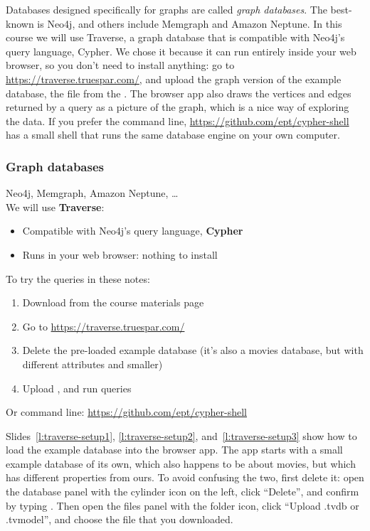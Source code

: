 Databases designed specifically for graphs are called \emph{graph databases}.
The best-known is Neo4j, and others include Memgraph and Amazon Neptune.
In this course we will use Traverse, a graph database that is compatible with Neo4j's query language, Cypher.
We chose it because it can run entirely inside your web browser, so you don't need to install anything: go to \url{https://traverse.truespar.com/}, and upload the graph version of the example database, the file  from the \materialspage{}.
The browser app also draws the vertices and edges returned by a query as a picture of the graph, which is a nice way of exploring the data.
If you prefer the command line, \url{https://github.com/ept/cypher-shell} has a small shell that runs the same database engine on your own computer.

\begin{frame}
    \label{s:traverse}
    \frametitle{Graph databases}
    Neo4j, Memgraph, Amazon Neptune, \dots\\[1em]
    We will use \textbf{Traverse}:
    \begin{itemize}
        \item Compatible with Neo4j's query language, \textbf{Cypher}
        \item Runs in your web browser: nothing to install\\[1em]\pause
    \end{itemize}
    To try the queries in these notes:
    \begin{enumerate}
        \item Download  from the course materials page
        \item Go to \url{https://traverse.truespar.com/}
        \item Delete the pre-loaded example database (it's also a movies database, but with different attributes and smaller)
        \item Upload , and run queries
    \end{enumerate}
    Or command line: \url{https://github.com/ept/cypher-shell}
\end{frame}
\label{l:traverse}

Slides~\ref{l:traverse-setup1}, \ref{l:traverse-setup2}, and~\ref{l:traverse-setup3} show how to load the example database into the browser app.
The app starts with a small example database of its own, which also happens to be about movies, but which has different properties from ours.
To avoid confusing the two, first delete it: open the database panel with the cylinder icon on the left, click ``Delete'', and confirm by typing .
Then open the files panel with the folder icon, click ``Upload .tvdb or .tvmodel'', and choose the  file that you downloaded.

